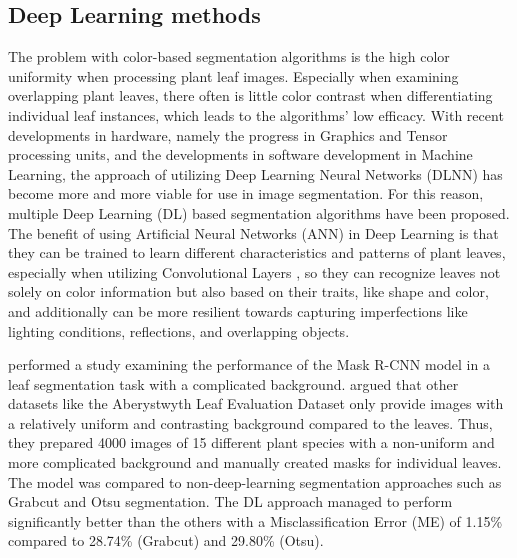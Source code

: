 \documentclass[draft,final]{vutinfth} %
\begin{document}
\subsection{Deep Learning methods}
The problem with color-based segmentation algorithms is the high color uniformity when processing plant leaf images. Especially when examining overlapping plant leaves, there often is little color contrast when differentiating individual leaf instances, which leads to the algorithms' low efficacy.
With recent developments in hardware, namely the progress in Graphics and Tensor processing units, and the developments in software development in Machine Learning, the approach of utilizing Deep Learning Neural Networks (DLNN) has become more and more viable for use in image segmentation. For this reason, multiple Deep Learning (DL) based segmentation algorithms have been proposed. The benefit of using Artificial Neural Networks (ANN) in Deep Learning is that they can be trained to learn different characteristics and patterns of plant leaves, especially when utilizing Convolutional Layers \cite{patil_convolutional_2021}, so they can recognize leaves not solely on color information but also based on their traits, like shape and color, and additionally can be more resilient towards capturing imperfections like lighting conditions, reflections, and overlapping objects. 

\cite{yang_leaf_2020} performed a study examining the performance of the Mask R-CNN model in a leaf segmentation task with a complicated background. \citeauthor{yang_leaf_2020} argued that other datasets like the Aberystwyth Leaf Evaluation Dataset \cite{bell_aberystwyth_2016, scharr_leaf_2016, minervini_finely-grained_2016} only provide images with a relatively uniform and contrasting background compared to the leaves. Thus, they prepared 4000 images of 15 different plant species with a non-uniform and more complicated background and manually created masks for individual leaves. The model was compared to non-deep-learning segmentation approaches such as Grabcut and Otsu segmentation. The DL approach managed to perform significantly better than the others with a Misclassification Error (ME) of 1.15\% compared to 28.74\% (Grabcut) and 29.80\% (Otsu).
\end{document}
